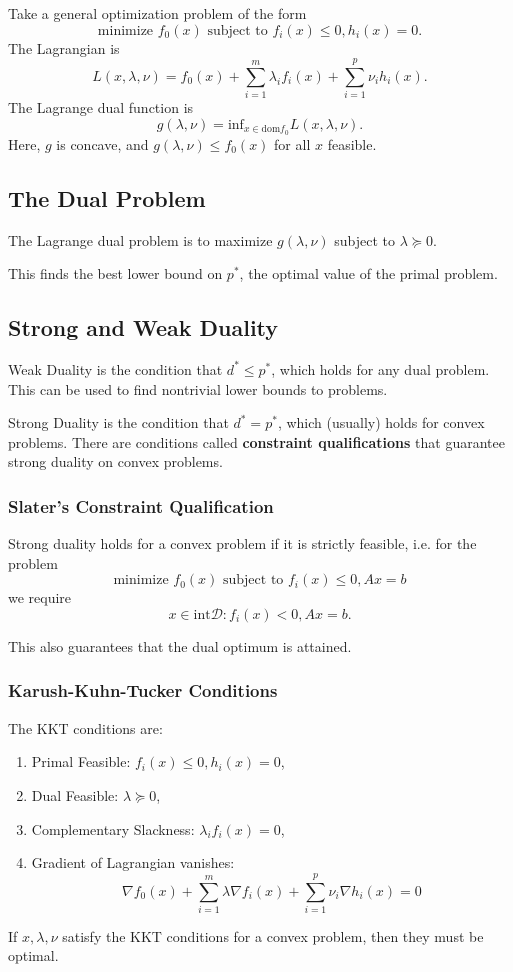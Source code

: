 \documentclass[11pt]{article}
\begin{document}
Take a general optimization problem of the form 
\[ \text{minimize } f_0(x) \text{ subject to } f_i(x) \leq 0, h_i(x) = 0. \]
The Lagrangian is 
\[ L(x, \lambda, \nu) = f_0(x) + \sum_{i=1}^m \lambda_i f_i(x) + \sum_{i=1}^p \nu_i h_i(x). \]
The Lagrange dual function is
\[ g(\lambda, \nu) = \mathrm{inf}_{x \in \mathrm{dom}f_0} L(x, \lambda, \nu). \]
Here, $g$ is concave, and $g(\lambda, \nu) \leq f_0(x)$ for all $x$ feasible. \par

\subsection{The Dual Problem} 
The Lagrange dual problem is to maximize $g(\lambda, \nu)$ subject to $\lambda \succeq 0$. \par

This finds the best lower bound on $p^*$, the optimal value of the primal problem. \par

\subsection{Strong and Weak Duality} 
Weak Duality is the condition that $d^* \leq p^*$, which holds for any dual problem. This can be used to find nontrivial lower bounds to problems. \par 
Strong Duality is the condition that $d^* = p^*$, which (usually) holds for convex problems. There are conditions called \textbf{constraint qualifications} that guarantee strong duality on convex problems. 

\subsubsection*{Slater's Constraint Qualification}
Strong duality holds for a convex problem if it is strictly feasible, i.e. for the problem 
\[ \text{minimize } f_0(x) \text{ subject to } f_i(x) \leq 0, Ax=b \] 
we require 
\[ x \in \mathrm{int} \mathcal{D}: f_i(x) < 0, Ax = b. \] 

This also guarantees that the dual optimum is attained. \par 

\subsubsection*{Karush-Kuhn-Tucker Conditions}
The KKT conditions are: 
\begin{enumerate}[label=\arabic*.]
    \item Primal Feasible: $f_i(x) \leq 0, h_i(x) = 0$, 
    \item Dual Feasible: $\lambda \succeq 0$,
    \item Complementary Slackness: $\lambda_i f_i(x) = 0$,
    \item Gradient of Lagrangian vanishes: 
    \[ \nabla f_0(x) + \sum_{i=1}^m \lambda\nabla f_i(x) + \sum_{i=1}^p \nu_i\nabla h_i(x) = 0 \] 
\end{enumerate}
If $x, \lambda, \nu$ satisfy the KKT conditions for a convex problem, then they must be optimal. 
\end{document}
